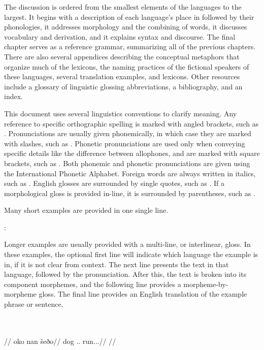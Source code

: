The discussion is ordered from the smallest elements of the languages to the largest. It begins with a description of each language's place in \landn{} followed by their phonologies, it addresses morphology and the combining of words, it discusses vocabulary and derivation, and it explains syntax and discourse. The final chapter serves as a reference grammar, summarizing all of the previous chapters. There are also several appendices describing the conceptual metaphors that organize much of the lexicons, the naming practices of the fictional speakers of these languages, several translation examples, and lexicons. Other resources include a glossary of linguistic glossing abbreviations, a bibliography, and an index.

This document uses several linguistics conventions to clarify meaning. Any reference to specific orthographic spelling is marked with angled brackets, such as . Pronunciations are usually given phonemically, in which case they are marked with slashes, such as . Phonetic pronunciations are used only when conveying specific details like the difference between allophones, and are marked with square brackets, such as . Both phonemic and phonetic pronunciations are given using the International Phonetic Alphabet. Foreign words are always written in italics, such as . English glosses are surrounded by single quotes, such as . If a morphological gloss is provided in-line, it is surrounded by parentheses, such as \gloss{\Inf}.

Many short examples are provided in one single line.

	\langtvk:    
\xe

Longer examples are usually provided with a multi-line, or interlinear, gloss. In these examples, the optional first line will indicate which language the example is in, if it is not clear from context. The next line presents the text in that language, followed by the pronunciation. After this, the text is broken into its component morphemes, and the following line provides a morpheme-by-morpheme gloss. The final line provides an English translation of the example phrase or sentence.

\begingl
\glpreamble \langtvk\\
\\
//
\gla oko nan šeðo//
\glb dog \Pl.\An.\Top{} run.\Ind.\Pst.\Prg//
\glft {}//
\endgl
\xe

